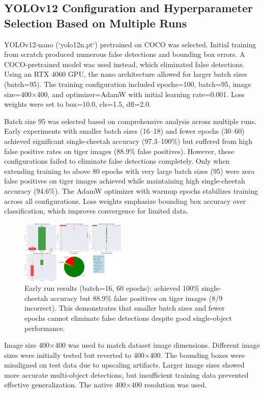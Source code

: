 \documentclass[conference]{IEEEtran}
\begin{document}
\subsection{YOLOv12 Configuration and Hyperparameter Selection Based on Multiple Runs}

YOLOv12-nano (`yolo12n.pt`) pretrained on COCO was selected. Initial training from scratch produced numerous false detections and bounding box errors. A COCO-pretrained model was used instead, which eliminated false detections. Using an RTX 4060 GPU, the nano architecture allowed for larger batch sizes (batch=95). The training configuration included epochs=100, batch=95, image size=400×400, and optimizer=AdamW with initial learning rate=0.001. Loss weights were set to box=10.0, cls=1.5, dfl=2.0.

Batch size 95 was selected based on comprehensive analysis across multiple runs. Early experiments with smaller batch sizes (16–18) and fewer epochs (30–60) achieved significant single-cheetah accuracy (97.3–100\%) but suffered from high false positive rates on tiger images (88.9\% false positives). However, these configurations failed to eliminate false detections completely. Only when extending training to above 80 epochs with very large batch sizes (95) were zero false positives on tiger images achieved while maintaining high single-cheetah accuracy (94.6\%). The AdamW optimizer with warmup epochs stabilizes training across all configurations. Loss weights emphasize bounding box accuracy over classification, which improves convergence for limited data.

\begin{figure}[htbp]
\centerline{\includegraphics[width=0.45\textwidth]{enhanced_validation_batch16.png}}
\caption{Early run results (batch=16, 60 epochs): achieved 100\% single-cheetah accuracy but 88.9\% false positives on tiger images (8/9 incorrect). This demonstrates that smaller batch sizes and fewer epochs cannot eliminate false detections despite good single-object performance.}
\label{fig:batch16_results}
\end{figure}

Image size 400×400 was used to match dataset image dimensions. Different image sizes were initially tested but reverted to 400×400. The bounding boxes were misaligned on test data due to upscaling artifacts. Larger image sizes showed more accurate multi-object detections, but insufficient training data prevented effective generalization. The native 400×400 resolution was used.
\end{document}
